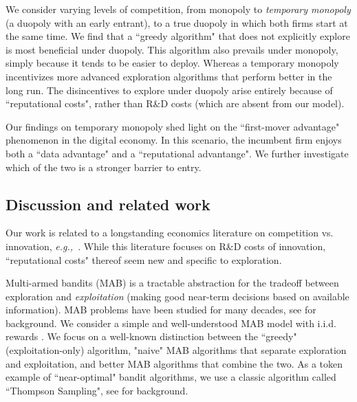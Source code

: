 \documentclass[letterpaper]{article}
\theoremstyle{definition}
\newcommand{\eg}{{\em e.g.,~\xspace}}
\begin{document}
We consider varying levels of competition, from monopoly to \emph{temporary monopoly} (a duopoly with an early entrant), to a true duopoly in which both firms start at the same time. We find that a ``greedy algorithm" that does not explicitly explore is most beneficial under duopoly. This algorithm also prevails under monopoly, simply because it tends to be easier to deploy. Whereas a temporary monopoly incentivizes more advanced exploration algorithms that perform better in the long run. The disincentives to explore under duopoly arise entirely because of ``reputational costs", rather than R\&D costs (which are absent from our model).





Our findings on temporary monopoly shed light on the ``first-mover advantage" phenomenon in the digital economy. In this scenario, the incumbent firm enjoys both a ``data advantage" and a ``reputational advantange". We further investigate which of the two is a stronger barrier to entry. 









\subsection{Discussion and related work}
Our work is related to a longstanding economics literature on competition vs. innovation, \eg \cite{Schumpeter-42,barro2004economic,Aghion-QJE05}. While this literature focuses on R\&D costs of innovation, ``reputational costs" thereof seem new and specific to exploration.

Multi-armed bandits (MAB) is a tractable abstraction for the tradeoff between exploration and \emph{exploitation} (making good near-term decisions based on available information). MAB problems have been studied for many decades, see \cite{Bubeck-survey12} for background. We consider a simple and well-understood MAB model with i.i.d. rewards \cite{bandits-ucb1}. We focus on a well-known distinction between the ``greedy" (exploitation-only) algorithm, "naive" MAB  algorithms that separate exploration and exploitation, and better MAB algorithms that combine the two. As a token example of ``near-optimal" bandit algorithms, 
we use a classic algorithm called ``Thompson Sampling", see \cite{TS-survey-FTML18} for background.
\end{document}
